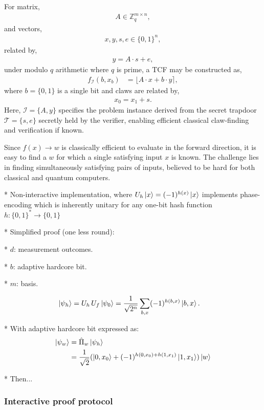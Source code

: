For matrix,
\begin{align}
	A\in\mathbb{Z}_q^{m\times n},
\end{align}
and vectors,
\begin{align}
	x,y,s,e\in\{0,1\}^n,
\end{align}
related by,
\begin{align}
	y = A\cdot s + e,
\end{align}
under modulo $q$ arithmetic where $q$ is prime, a TCF may be constructed as,
\begin{align}
	f_\mathcal{I}(b,x_b) & = \lfloor A\cdot x + b\cdot y\rceil,
\end{align}
where $b=\{0,1\}$ is a single bit and claws are related by,
\begin{align}
	x_0=x_1+s.
\end{align}
Here, $\mathcal{I}=\{A,y\}$ specifies the problem instance derived from the secret trapdoor $\mathcal{T}=\{s,e\}$ secretly held by the verifier, enabling efficient classical claw-finding and verification if known.

Since $f(x)\to w$ is classically efficient to evaluate in the forward direction, it is easy to find a $w$ for which a single satisfying input $x$ is known. The challenge lies in finding simultaneously satisfying pairs of inputs, believed to be hard for both classical and quantum computers.

* Non-interactive implementation, where $U_h\ket{x}=(-1)^{h(x)}\ket{x}$ implements phase-encoding which is inherently unitary for any one-bit hash function $h: \{0,1\}^*\to\{0,1\}$

* Simplified proof (one less round):

* $d$: measurement outcomes.

* $b$: adaptive hardcore bit.

* $m$: basis.

\begin{align}
	\ket{\psi_h} &= U_h\, U_f \ket{\psi_0} = \frac{1}{\sqrt{2^n}} \sum_{b,x} (-1)^{h(b,x)} \ket{b,x}.
\end{align}

* With adaptive hardcore bit expressed as:
\begin{align}
	\ket{\psi_w} &= \hat\Pi_w \ket{\psi_h} \nonumber\\
		&= \frac{1}{\sqrt{2}}(\ket{0,x_0}+(-1)^{h(0,x_0)+h(1,x_1)}\ket{1,x_1})\ket{w}
\end{align}

* Then...

\subsubsection{Interactive proof protocol}

